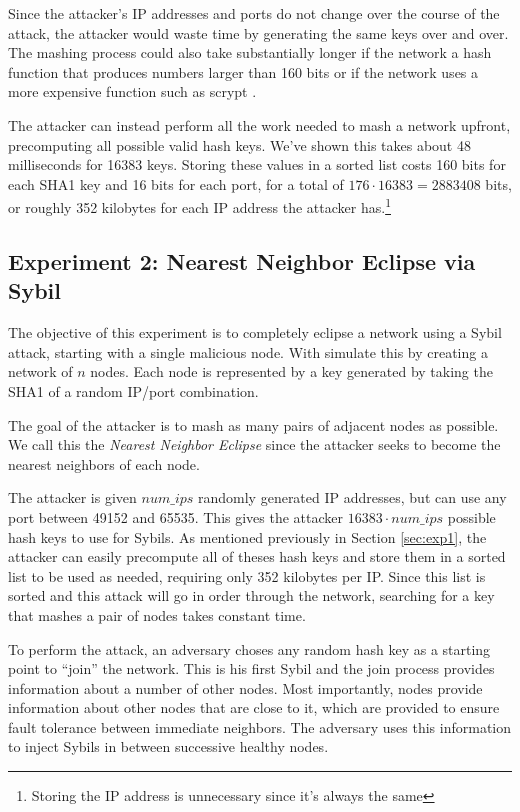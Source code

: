 \documentclass[11pt,conference]{IEEEtran}
\begin{document}
Since the attacker's IP addresses and ports do not change over the course of the attack, the attacker would waste time by generating the same keys over and over. 
The mashing process could also take substantially longer if the network a hash function that produces numbers larger than 160 bits or if the network uses a more expensive function such as scrypt \cite{scrypt}.

The attacker can instead perform all the work needed to mash a network upfront, precomputing all possible valid hash keys.
We've shown this takes about 48 milliseconds for 16383 keys.
Storing these values in a sorted list costs 160 bits for each SHA1 key and 16 bits for each port, for a total of $176  \cdot 16383 = 2883408$ bits, or roughly 352 kilobytes for each IP address the attacker has.\footnote{Storing the IP address is unnecessary since it's always the same}




\subsection{Experiment 2:  Nearest Neighbor Eclipse via Sybil} %
\label{sec:exp2}
The objective of this experiment is to completely eclipse a network using a Sybil attack, starting with a single malicious node.
With simulate this by creating a network of $n$ nodes.  
Each node is represented by a key generated by taking the SHA1 of a random IP/port combination.

The goal of the attacker is to mash as many pairs of adjacent nodes as possible.
We call this the \textit{Nearest Neighbor Eclipse} since the attacker seeks to become the nearest neighbors of each node.

The attacker is given $num\_ips$ randomly generated IP addresses, but can use any port between 49152 and 65535.
This gives the attacker $ 16383 \cdot num\_ips $ possible hash keys to use for Sybils.
As mentioned previously in Section \ref{sec:exp1}, the attacker can easily precompute all of theses hash keys and store them in a sorted list to be used as needed, requiring only 352 kilobytes per IP.
Since this list is sorted and this attack will go in order through the network, searching for a key that mashes a pair of nodes takes constant time.

To perform the attack, an adversary choses any random hash key as a starting point to ``join'' the network.
This is his first Sybil and the join process provides information about a number of other nodes.
Most importantly, nodes provide information about other nodes that are close to it, which are provided to ensure fault tolerance between immediate neighbors.
The adversary uses this information to inject Sybils in between successive healthy nodes.
\end{document}
